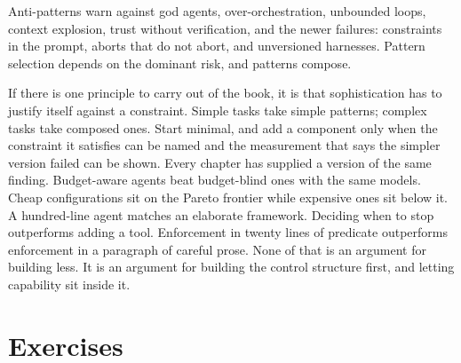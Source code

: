 \documentclass[11pt]{book}
\begin{document}
Anti-patterns warn against god agents, over-orchestration, unbounded loops, context explosion, trust without verification, and the newer failures: constraints in the prompt, aborts that do not abort, and unversioned harnesses. Pattern selection depends on the dominant risk, and patterns compose.

If there is one principle to carry out of the book, it is that sophistication has to justify itself against a constraint. Simple tasks take simple patterns; complex tasks take composed ones. Start minimal, and add a component only when the constraint it satisfies can be named and the measurement that says the simpler version failed can be shown. Every chapter has supplied a version of the same finding. Budget-aware agents beat budget-blind ones with the same models. Cheap configurations sit on the Pareto frontier while expensive ones sit below it. A hundred-line agent matches an elaborate framework. Deciding when to stop outperforms adding a tool. Enforcement in twenty lines of predicate outperforms enforcement in a paragraph of careful prose. None of that is an argument for building less. It is an argument for building the control structure first, and letting capability sit inside it.

\section*{Exercises}
\end{document}
